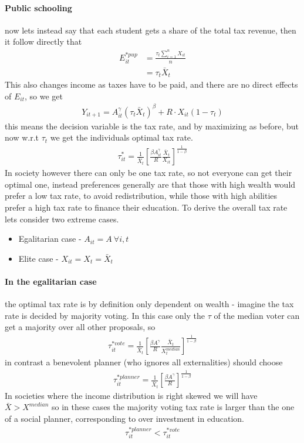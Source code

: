 \documentclass[12pt, a4paper]{article}
\begin{document}
\begin{multicols}{2}
\paragraph{Public schooling} now lets instead say that each student gets a share of the total tax revenue, then it follow directly that 
\begin{align*}
E_{it}^{*pup} &= \frac{\tau_t \sum_{i=1}^n X_{it}}{n} \\
&= \tau_t \bar{X}_t
\end{align*}
This also changes income as taxes have to be paid, and there are no direct effects of $E_{it}$, so we get
\begin{align*}
Y_{it+1} = A_{it}^{\gamma}(\tau_t \bar{X}_t)^{\beta} + R \cdot X_{it}(1-\tau_t)
\end{align*}
this means the decision variable is the tax rate, and by maximizing as before, but now w.r.t $\tau_t$ we get the individuals optimal tax rate.
\begin{align*}
\tau_{it}^{*} = \frac{1}{\bar{X}_t} \left[ \frac{\beta A_{it}^{\gamma}}{R} \frac{\bar{X}_t}{X_{it}} \right]^{\frac{1}{1-\beta}}
\end{align*}
In society however there can only be one tax rate, so not everyone can get their optimal one, instead preferences generally are that those with high wealth would prefer a low tax rate, to avoid redistribution, while those with high abilities prefer a high tax rate to finance their education. To derive the overall tax rate lets consider two extreme cases.
\begin{itemize}
\item Egalitarian case - $A_{it}= A \ \forall i,t$
\item Elite case - $X_{it}= X_t = \bar{X}_t$
\end{itemize}

\paragraph{In the egalitarian case} the optimal tax rate is by definition only dependent on wealth - imagine the tax rate is decided by majority voting. In this case only the $\tau$ of the median voter can get a majority over all other proposals, so
\begin{align*}
\tau_{it}^{*vote} = \frac{1}{\bar{X}_t} \left[ \frac{\beta A^{\gamma}}{R} \frac{\bar{X}_t}{X_{t}^{median}} \right]^{\frac{1}{1-\beta}}
\end{align*}
in contrast a benevolent planner (who ignores all externalities) should choose 
\begin{align*}
\tau_{it}^{*planner} = \frac{1}{\bar{X}_t} \left[ \frac{\beta A^{\gamma}}{R}  \right]^{\frac{1}{1-\beta}}
\end{align*}
In societies where the income distribution is right skewed we will have $\bar{X}>X^{median}$ so in these cases the majority voting tax rate is larger than the one of a social planner, corresponding to over investment in education.
\begin{align*}
\tau_{it}^{*planner} < \tau_{it}^{*vote}
\end{align*}



\end{multicols}
\end{document}
